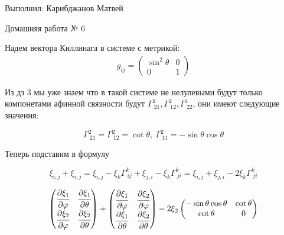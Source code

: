 \documentclass[a4paper]{article}
\renewcommand{\phi}{\varphi}
\newcommand{\piv}[2]{\cfrac{\partial #1}{\partial #2}}
\numberwithin{equation}{section}
\begin{document}
\begin{flushright}
    Выполнил:
    Карибджанов Матвей

    Домашняя работа № 6
\end{flushright}
\pagestyle{main}

Надем вектора Киллинага в системе с метрикой:
\begin{gather}
    g_{ij} = 
    \begin{pmatrix}
        \sin^2 \theta & 0 \\
        0 & 1
    \end{pmatrix}
\end{gather}

Из дз 3 мы уже знаем что в такой системе не нелулевыми 
будут только компонетами афинной связности будут 
$\Gamma^{2}_{\ 21}, \Gamma^{2}_{\ 12}, \Gamma^{1}_{\ 22}$, 
они имеют следующие значения:

\begin{equation}
    \Gamma^{2}_{\ 21} = \Gamma^{2}_{\ 12} = \cot \theta, \ \Gamma^{2}_{\ 11} = - \sin \theta \cos \theta
\end{equation}

Теперь подставим в формулу

\begin{equation}
    \xi_{i;j} + \xi_{i;j} = \xi_{i,j} - \xi_{k} \Gamma^{k}_{\ ij} 
    + \xi_{j,i} - \xi_{k} \Gamma^{k}_{\ ji} = 
    \xi_{i,j} + \xi_{j,i} - 2 \xi_{k} \Gamma^{k}_{\ ji}
\end{equation}

\begin{gather}
    \begin{pmatrix}
        \piv{\xi_1}{\phi} & \piv{\xi_1}{\theta} \\
        \piv{\xi_2}{\phi} & \piv{\xi_2}{\theta}
    \end{pmatrix}
    + 
    \begin{pmatrix}
        \piv{\xi_1}{\phi} & \piv{\xi_2}{\phi} \\
        \piv{\xi_1}{\theta} & \piv{\xi_2}{\theta}
    \end{pmatrix}
    - 
    2\xi_2
    \begin{pmatrix}
        -\sin \theta \cos \theta & \cot \theta\\
        \cot \theta & 0
    \end{pmatrix}
\end{gather}
\end{document}
